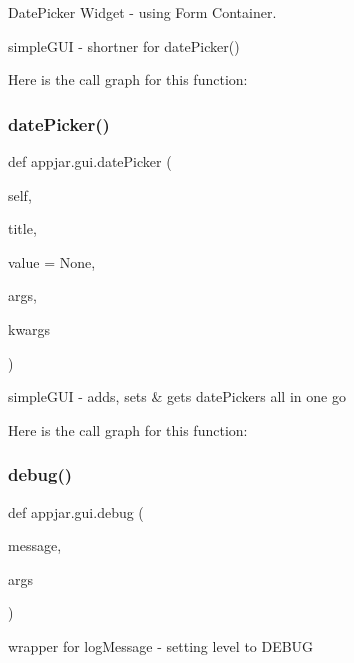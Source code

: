 Date\+Picker Widget -\/ using Form Container. 

\begin{DoxyVerb}simpleGUI - shortner for datePicker() \end{DoxyVerb}
 Here is the call graph for this function\+:
\mbox{\label{classappjar_1_1gui_a5a5939efc644b1946f3c28dcf35f2844}} 
\subsubsection{\texorpdfstring{date\+Picker()}{datePicker()}}
{\footnotesize\ttfamily def appjar.\+gui.\+date\+Picker (\begin{DoxyParamCaption}\item[{}]{self,  }\item[{}]{title,  }\item[{}]{value = {\ttfamily None},  }\item[{}]{args,  }\item[{}]{kwargs }\end{DoxyParamCaption})}

\begin{DoxyVerb}simpleGUI - adds, sets & gets datePickers all in one go \end{DoxyVerb}
 Here is the call graph for this function\+:
\mbox{\label{classappjar_1_1gui_a4fff60acabbcc4f8c2e44d546d5f332b}} 
\subsubsection{\texorpdfstring{debug()}{debug()}}
{\footnotesize\ttfamily def appjar.\+gui.\+debug (\begin{DoxyParamCaption}\item[{}]{message,  }\item[{}]{args }\end{DoxyParamCaption})\hspace{0.3cm}{\ttfamily [static]}}

\begin{DoxyVerb}wrapper for logMessage - setting level to DEBUG \end{DoxyVerb}
 \mbox{\label{classappjar_1_1gui_ab62464e72a72f5159c279f1218a2a447}} 
